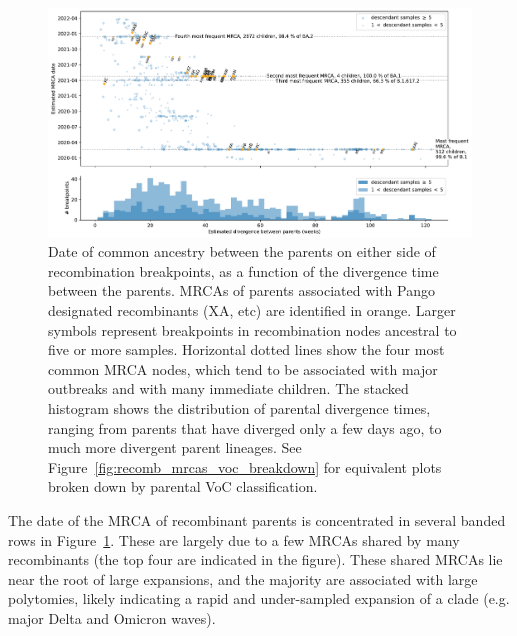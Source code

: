\documentclass{article}
\begin{document}
\begin{figure} \centering
\includegraphics[width=\textwidth]{figures/recombination_node_mrcas.pdf}
\caption{\label{fig:recomb_mrcas}
Date of common ancestry between the parents on either side of recombination
breakpoints, as a function of the divergence time between the parents.
MRCAs of parents associated with Pango designated recombinants (XA, etc)
are identified in orange. Larger symbols represent breakpoints in recombination
nodes ancestral to five or more samples.
Horizontal dotted lines show the four most common MRCA nodes,
which tend to be associated with major outbreaks and with many immediate children.
The stacked histogram shows the distribution of parental divergence times, ranging
from parents that have diverged only a few days ago, to much more
divergent parent lineages. See Figure~\ref{fig:recomb_mrcas_voc_breakdown}
for equivalent plots broken down by parental VoC classification.
}
\end{figure}

The date of the MRCA of recombinant parents is
concentrated in several banded rows in Figure~\ref{fig:recomb_mrcas}. These are
largely due to a few MRCAs shared by many
recombinants (the top four are indicated in the figure).
These shared MRCAs lie near the root of large expansions,
and the majority are associated with large polytomies, likely
indicating a rapid and under-sampled expansion of a clade (e.g. major
Delta and Omicron waves).
\end{document}
